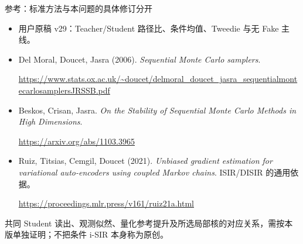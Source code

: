 \documentclass[10pt,aspectratio=169]{beamer}
\begin{document}
\begin{frame}{参考：标准方法与本问题的具体修订分开}
\footnotesize
\begin{itemize}\itemsep6pt
\item 用户原稿 v29：Teacher/Student 路径比、条件均值、Tweedie 与无 Fake 主线。
\item Del Moral, Doucet, Jasra (2006). \emph{Sequential Monte Carlo samplers}.\par
\url{https://www.stats.ox.ac.uk/~doucet/delmoral_doucet_jasra_sequentialmontecarlosamplersJRSSB.pdf}
\item Beskos, Crisan, Jasra. \emph{On the Stability of Sequential Monte Carlo Methods in High Dimensions}.\par
\url{https://arxiv.org/abs/1103.3965}
\item Ruiz, Titsias, Cemgil, Doucet (2021). \emph{Unbiased gradient estimation for variational auto-encoders using coupled Markov chains}. ISIR/DISIR 的通用依据。\par
\url{https://proceedings.mlr.press/v161/ruiz21a.html}
\end{itemize}
\par 共同 Student 读出、观测似然、量化参考提升及所选局部核的对应关系，需按本版单独证明；不把条件 i-SIR 本身称为原创。
\end{frame}
\end{document}
